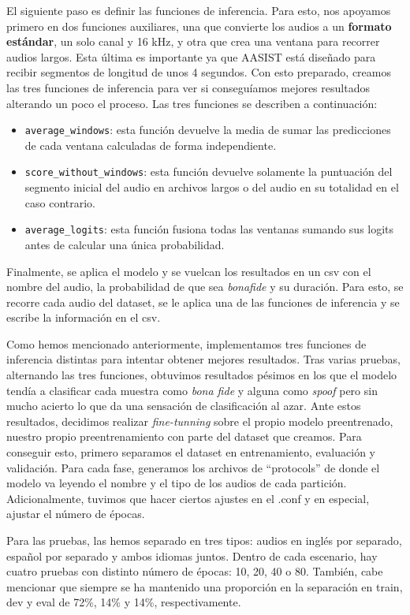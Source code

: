 El siguiente paso es definir las funciones de inferencia. Para esto, nos apoyamos primero en dos funciones auxiliares, una que convierte los audios a un \textbf{formato estándar}, un solo canal y 16 kHz, y otra que crea una ventana para recorrer audios largos. Esta última es importante ya que AASIST está diseñado para recibir segmentos de longitud de unos 4 segundos.
Con esto preparado, creamos las tres funciones de inferencia para ver si conseguíamos mejores resultados alterando un poco el proceso. Las tres funciones se describen a continuación:
\begin{itemize}
    \item \texttt{average\_windows}: esta función devuelve la media de sumar las predicciones de cada ventana calculadas de forma independiente.
    \item \texttt{score\_without\_windows}: esta función devuelve solamente la puntuación del segmento inicial del audio en archivos largos o del audio en su totalidad en el caso contrario.
    \item \texttt{average\_logits}: esta función fusiona todas las ventanas sumando sus logits antes de calcular una única probabilidad.
\end{itemize}
Finalmente, se aplica el modelo y se vuelcan los resultados en un csv con el nombre del audio, la probabilidad de que sea \textit{bonafide} y su duración. Para esto, se recorre cada audio del dataset, se le aplica una de las funciones de inferencia y se escribe la información en el csv.

Como hemos mencionado anteriormente, implementamos tres funciones de inferencia distintas para intentar obtener mejores resultados. Tras varias pruebas, alternando las tres funciones, obtuvimos resultados pésimos en los que el modelo tendía a clasificar cada muestra como \textit{bona fide} y alguna como \textit{spoof} pero sin mucho acierto lo que da una sensación de clasificación al azar.
Ante estos resultados, decidimos realizar \textit{fine-tunning} sobre el propio modelo preentrenado, nuestro propio preentrenamiento con parte del dataset que creamos. Para conseguir esto, primero separamos el dataset en entrenamiento, evaluación y validación. Para cada fase, generamos los archivos de ``protocols'' de donde el modelo va leyendo el nombre y el tipo de los audios de cada partición. Adicionalmente, tuvimos que hacer ciertos ajustes en el .conf y en especial, ajustar el número de épocas.

Para las pruebas, las hemos separado en tres tipos: audios en inglés por separado, español por separado y ambos idiomas juntos. Dentro de cada escenario, hay cuatro pruebas con distinto número de épocas: 10, 20, 40 o 80. También, cabe mencionar que siempre se ha mantenido una proporción en la separación en train, dev y eval de 72\%, 14\% y 14\%, respectivamente.

